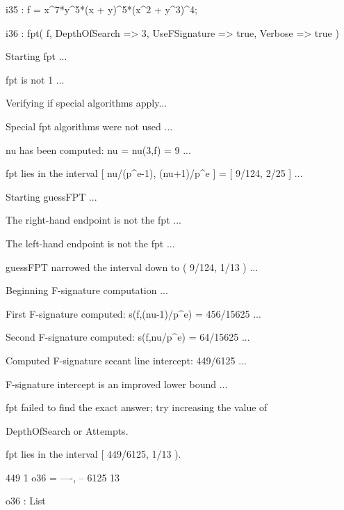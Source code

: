 \documentclass{amsart}
\begin{document}
{\small
{}
\begin{MyVerbatim}

i35 : f = x^7*y^5*(x + y)^5*(x^2 + y^3)^4;

i36 : fpt( f, DepthOfSearch => 3, UseFSignature => true, Verbose => true )

Starting fpt ...

fpt is not 1 ...

Verifying if special algorithms apply...

Special fpt algorithms were not used ...

nu has been computed: nu = nu(3,f) = 9 ...

fpt lies in the interval [ nu/(p^e-1), (nu+1)/p^e ] = [ 9/124, 2/25 ] ...

Starting guessFPT ...

The right-hand endpoint is not the fpt ...

The left-hand endpoint is not the fpt ...

guessFPT narrowed the interval down to ( 9/124, 1/13 ) ...

Beginning F-signature computation ...

First F-signature computed: s(f,(nu-1)/p^e) = 456/15625 ...

Second F-signature computed: s(f,nu/p^e) = 64/15625 ...

Computed F-signature secant line intercept: 449/6125 ...

F-signature intercept is an improved lower bound ...

fpt failed to find the exact answer; try increasing the value of 

DepthOfSearch or Attempts.

fpt lies in the interval [ 449/6125, 1/13 ).

        449   1
o36 = {----, --}
       6125  13

o36 : List

\end{MyVerbatim}
}

\newpage


\end{document}
